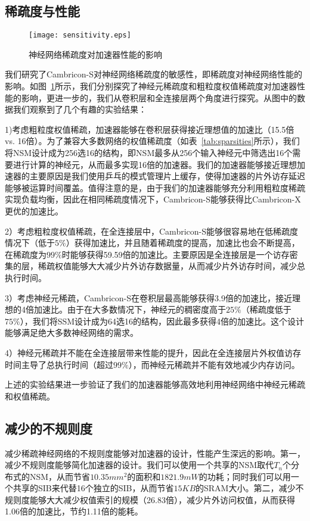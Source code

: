 \subsection{稀疏度与性能}
\begin{figure}[h]
\centering
\texttt{[image: sensitivity.eps]}
\caption{神经网络稀疏度对加速器性能的影响}
\label{fig:sensitivity}
\end{figure}

我们研究了Cambricon-S对神经网络稀疏度的敏感性，即稀疏度对神经网络性能的影响。如图~\ref{fig:sensitivity}所示，我们分别探究了神经元稀疏度和粗粒度权值稀疏度对加速器性能的影响，更进一步的，我们从卷积层和全连接层两个角度进行探究。从图中的数据我们观察到了几个有趣的实验结果：

1)考虑粗粒度权值稀疏，加速器能够在卷积层获得接近理想值的加速比（15.5倍 vs. 16倍）。为了兼容大多数网络的权值稀疏度（如表~\ref{tab:sparsities}所示），我们将NSM设计成为256选16的结构，即NSM最多从256个输入神经元中筛选出16个需要进行计算的神经元，从而最多实现16倍的加速器。我们的加速器能够接近理想加速器的主要原因是我们使用乒乓的模式管理片上缓存，使得加速器的片外访存延迟能够被运算时间覆盖。值得注意的是，由于我们的加速器能够充分利用粗粒度稀疏实现负载均衡，因此在相同稀疏度情况下，Cambricon-S能够获得比Cambricon-X更优的加速比。

2）考虑粗粒度权值稀疏，在全连接层中，Cambricon-S能够很容易地在低稀疏度情况下（低于$5\%$）获得加速比，并且随着稀疏度的提高，加速比也会不断提高，在稀疏度为$99\%$时能够获得59.59倍的加速比。主要原因是全连接层是一个访存密集的层，稀疏权值能够大大减少片外访存数据量，从而减少片外访存时间，减少总执行时间。

3）考虑神经元稀疏，Cambricon-S在卷积层最高能够获得3.9倍的加速比，接近理想的4倍加速比。由于在大多数情况下，神经元的稠密度高于$25\%$（稀疏度低于$75\%$），我们将SSM设计成为64选16的结构，因此最多获得4倍的加速比。这个设计能够满足绝大多数神经网络的需求。

4）神经元稀疏并不能在全连接层带来性能的提升，因此在全连接层片外权值访存时间主导了总执行时间（超过$99\%$），而神经元稀疏并不能有效地减少内存访问。

上述的实验结果进一步验证了我们的加速器能够高效地利用神经网络中神经元稀疏和权值稀疏。

\subsection{减少的不规则度}
减少稀疏神经网络的不规则度能够对加速器的设计，性能产生深远的影响。第一，减少不规则度能够简化加速器的设计。我们可以使用一个共享的NSM取代$T_n$个分布式的NSM，从而节省$10.35mm^2$的面积和$1821.9mW$的功耗；同时我们可以用一个共享的SIB来代替16个独立的SIB，从而节省$15KB$的SRAM大小。第二，减少不规则度能够大大减少权值索引的规模（26.83倍），减少片外访问权值，从而获得1.06倍的加速比，节约1.11倍的能耗。

